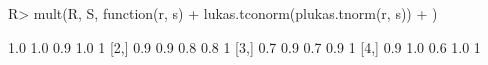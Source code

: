 \begin{Schunk}
% --begin: "comp.mult"
\begin{Sinput}
R> mult(R, S, function(r, s) {
+      lukas.tconorm(plukas.tnorm(r, s))
+  })
\end{Sinput}
\begin{Soutput}
     [,1] [,2] [,3] [,4] [,5]
[1,]  1.0  1.0  0.9  1.0    1
[2,]  0.9  0.9  0.8  0.8    1
[3,]  0.7  0.9  0.7  0.9    1
[4,]  0.9  1.0  0.6  1.0    1
\end{Soutput}
%
% --end: "comp.mult"
\end{Schunk}
